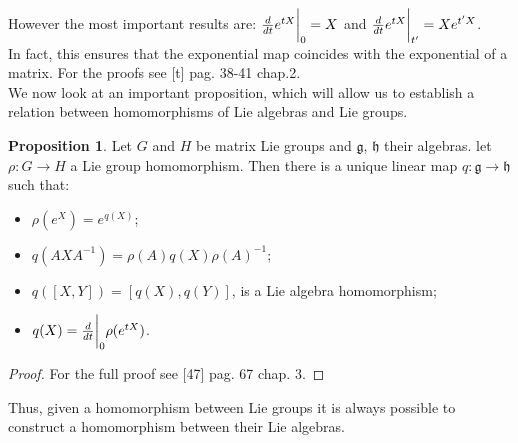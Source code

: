 \documentclass[12pt,a4paper]{report}
\theoremstyle{definition}
\theoremstyle{Theorem}
\newtheorem{Prop}[Def]{Proposition}
\theoremstyle{definition}
\theoremstyle{definition}
\begin{document}
		However the most important results are: ${d\over dt}e^{tX}\bigg{\rvert}_0=X$ and ${d\over dt}e^{tX}\bigg{\rvert}_{t'}=Xe^{t'X}$.\\
		In fact, this ensures that the exponential map coincides with the exponential of a matrix. For the proofs see [t] pag. 38-41 chap.2.\\
		We now look at an important proposition, which will allow us to establish a relation between homomorphisms of Lie algebras and Lie groups.
		\begin{Prop} \label{Prop: 2.4.1}
			Let $G$ and $H$ be matrix Lie groups and $\mathfrak{g}$, $\mathfrak{h}$ their algebras. let $\rho:G\rightarrow H$ a Lie group homomorphism. Then there is a unique linear map $q:\mathfrak{g}\rightarrow\mathfrak{h}$ such that:
			\begin{itemize}
				\item $\rho(e^X)=e^{q(X)}$; 
				\item $q(AXA^{-1})=\rho(A)q(X)\rho(A)^{-1}$;
				\item $q([X,Y])=[q(X),q(Y)]$, is a Lie algebra homomorphism;
				\item $q(X)={d\over dt}\bigg{\rvert}_0\rho(e^{tX})$.
			\end{itemize}
		\end{Prop}
		\begin{proof}
			For the full proof see [47] pag. 67 chap. 3.
		\end{proof}
		Thus, given a homomorphism between Lie groups it is always possible to construct a homomorphism between their Lie algebras.
\end{document}
